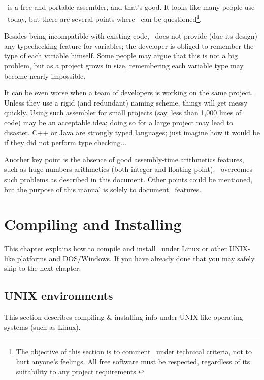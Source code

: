 \documentclass[a4paper,draft,12pt]{book}
\begin{document}
\section{\nasm}
\nasm\ is a free and portable assembler, and that's good. It looks
like many people use \nasm\ today, but there are several points
where \nasm\ can be questioned\footnote{The objective of this section
is to comment \nasm\ under technical criteria, not to hurt anyone's
feelings. All free software must be respected, regardless of its
suitability to any project requirements.}.

Besides being incompatible with existing code, \nasm\ does not
provide (due its design) any typechecking feature for variables;
the developer is obliged to remember the type of each variable
himself. Some people may argue that this is not a big problem,
but as a project grows in size, remembering each variable type
may become nearly impossible.

It can be even worse when a team of developers is working on
the same project. Unless they use a rigid (and redundant)
naming scheme, things will get messy quickly. Using such
assembler for small projects (say, less than 1,000 lines of
code) may be an acceptable idea; doing so for a large project
may lead to disaster. C++ or Java are strongly typed languages;
just imagine how it would be if they did not perform type checking...

Another key point is the absence of good assembly-time arithmetics
features, such as huge numbers arithmetics (both integer and floating
point). \popasm\ overcomes such problems as described in this
document. Other points could be mentioned, but the purpose of this
manual is solely to document \popasm\ features.

\chapter{Compiling and Installing \popasm}
This chapter explains how to compile and install \popasm\ under
Linux or other UNIX-like platforms and DOS/Windows. If you have
already done that you may safely skip to the next chapter.

\section{UNIX environments}

This section describes compiling \& installing info under UNIX-like
operating systems (such as Linux).
\end{document}
